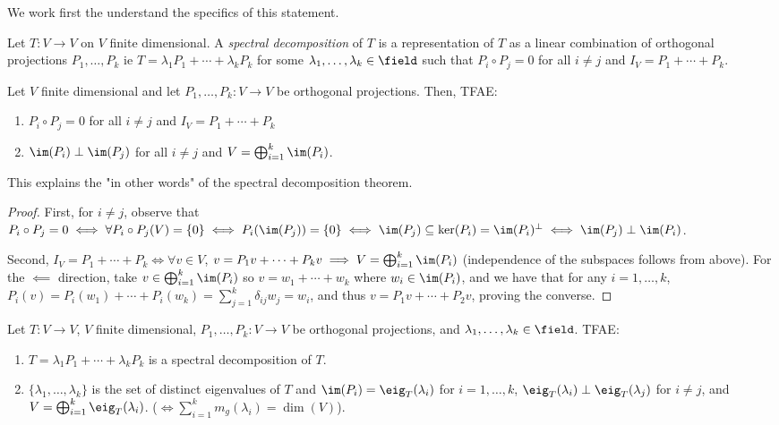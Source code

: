 We work first the understand the specifics of this statement.

\begin{definition}
    Let $T : V \to V$ on $V$ finite dimensional. A \emph{spectral decomposition} of $T$ is a representation of $T$ as a linear combination of orthogonal projections $P_1, \dots, P_k$ ie $T = \lambda_1 P_1 + \cdots + \lambda_k P_k$ for some $\lambda_1, \dots, \lambda_k \in \field$ such that $P_i \circ P_j = 0$ for all $i \neq j$ and $I_V = P_1 + \cdots + P_k$.
\end{definition}

\begin{lemma}
    Let $V$ finite dimensional and let $P_1, \dots, P_k : V \to V$ be orthogonal projections. Then, TFAE:
    \begin{enumerate}
        \item $P_i \circ P_j = 0$ for all $i \neq j$ and $I_V = P_1 + \cdots + P_k$
        \item $\im(P_i) \perp \im(P_j)$ for all $i \neq j$ and $V = \bigoplus_{i=1}^k \im(P_i)$.
    \end{enumerate}
\end{lemma}
\begin{remark}
    This explains the "in other words" of the spectral decomposition theorem.
\end{remark}

\begin{proof}
    First, for $i \neq j$, observe that $P_i \circ P_j = 0 \iff \forall P_i \circ P_j(V) = \{0\} \iff P_i(\im(P_j)) = \{0\} \iff \im(P_j) \subseteq \ker(P_i) = \im(P_i)^\perp \iff \im(P_j) \perp \im(P_i)$.

    Second, $I_V = P_1 + \cdots + P_k \iff \forall v\in V$, $v = P_1v + \cdots + P_k v \implies V = \bigoplus_{i=1}^k \im(P_i)$ (independence of the subspaces follows from above). For the $\impliedby$ direction, take $v \in \bigoplus_{i=1}^k \im(P_i)$ so $v = w_1 + \cdots + w_k$ where $w_i \in \im(P_i)$, and we have that for any $i = 1, \dots, k$, $P_i(v) = P_i(w_1) + \cdots + P_i(w_k) = \sum_{j=1}^k \delta_{ij} w_j = w_i$, and thus $v = P_1v + \cdots + P_2v$, proving the converse.
\end{proof}

\begin{lemma}
    Let $T : V \to V$, $V$ finite dimensional, $P_1, \dots, P_k : V \to V$ be orthogonal projections, and $\lambda_1, \dots, \lambda_k \in \field$. TFAE:\begin{enumerate}
        \item $T = \lambda_1 P_1 + \cdots + \lambda_k P_k$ is a spectral decomposition of $T$.
        \item $\{\lambda_1, \dots, \lambda_k\}$ is the set of distinct eigenvalues of $T$ and $\im(P_i) = \eig_{T}(\lambda_i)$ for $i = 1, \dots, k$, $\eig_{T}(\lambda_i) \perp \eig_T(\lambda_j)$ for $i \neq j$, and $V = \bigoplus_{i=1}^k \eig_T(\lambda_i)$. ($\iff \sum_{i=1}^k m_g(\lambda_i) = \dim(V)$).
    \end{enumerate}
\end{lemma}

